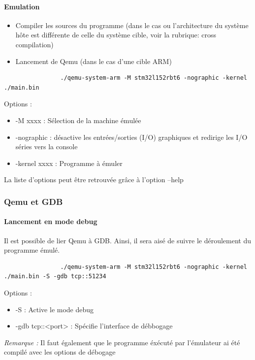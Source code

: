 \documentclass{article}
\begin{document}
			\paragraph{Emulation \\}
			\begin{itemize}
				\item Compiler les sources du programme (dans le cas ou l'architecture du système hôte est 
				différente de celle du système cible, voir la rubrique: cross compilation) 
				\item Lancement de Qemu (dans le cas d'une cible ARM) 
			\end{itemize}
			\begin{verbatim}
				./qemu-system-arm -M stm32l152rbt6 -nographic -kernel ./main.bin
			\end{verbatim}
			Options : 
			\begin{itemize}
				\item -M xxxx : Sélection de la machine émulée 
				\item -nographic : désactive les entrées/sorties (I/O) graphiques et redirige les I/O séries vers la console
				\item -kernel xxxx : Programme à émuler 
			\end{itemize}
			La liste d'options peut être retrouvée grâce à l'option --help 
			
		\subsubsection{Qemu et GDB}
			\paragraph{Lancement en mode debug \\}
			Il est possible de lier Qemu à GDB. Ainsi, il sera aisé de suivre le déroulement du programme émulé. 
			\begin{verbatim}
				./qemu-system-arm -M stm32l152rbt6 -nographic -kernel ./main.bin -S -gdb tcp::51234
			\end{verbatim}
			Options :
			\begin{itemize}
				\item -S : Active le mode debug 
				\item -gdb tcp::<port> : Spécifie l'interface de débbogage \\
			\end{itemize}
			\textit{Remarque :} Il faut également que le programme éxécuté par l'émulateur ai été compilé avec les options de débogage 
\end{document}
